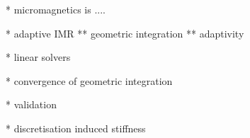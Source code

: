
* micromagnetics is ....

* adaptive IMR
** geometric integration
** adaptivity

* linear solvers

* convergence of geometric integration

* validation

* discretisation induced stiffness


